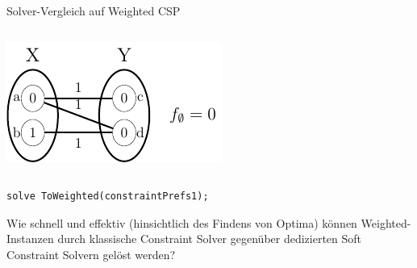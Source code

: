 \begin{frame}[fragile]{Solver-Vergleich auf Weighted CSP}
\begin{columns}[onlytextwidth]
\begin{column}{.45\textwidth}
    \includegraphics[scale=0.4]{img/toulbar2-0.png}
    \end{column}
\end{columns}
\begin{lstlisting}
solve ToWeighted(constraintPrefs1);
\end{lstlisting}
\begin{parchment}[Evaluationsfrage]
Wie schnell und effektiv (hinsichtlich des Findens von Optima) können Weighted-Instanzen durch klassische Constraint Solver gegenüber dedizierten Soft Constraint Solvern gelöst werden?
\end{parchment}
\end{frame}

